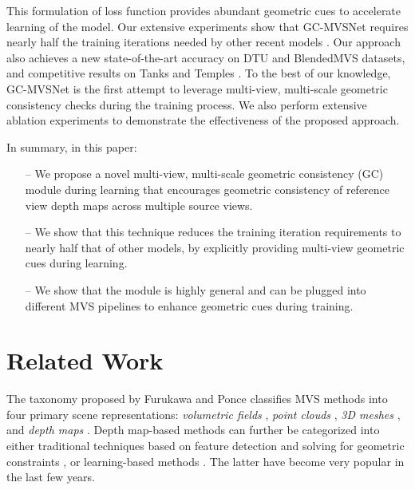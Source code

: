 \documentclass[10pt,twocolumn,letterpaper]{article}
\begin{document}
This formulation of loss function provides abundant geometric cues to
accelerate learning of the model. Our extensive experiments show that
GC-MVSNet requires nearly
half the training iterations needed by other recent models \cite{yao2018mvsnet,
  gu2019casmvsnet, peng2022rethinkingMVS, wei2021aa,
  ding2022transmvsnet}. Our approach also achieves a new state-of-the-art accuracy 
on DTU \cite{jensen2014dtu} and BlendedMVS \cite{yao2019blended}
datasets, and competitive results on
Tanks and Temples
\cite{Knapitsch2017tnt}. To the best
of our knowledge, GC-MVSNet is the first attempt to leverage
multi-view, multi-scale geometric consistency checks during the
training process. We also perform extensive ablation experiments to
demonstrate the effectiveness of the proposed approach.

In summary, in this paper:
\begin{itemize}
\setlength\itemsep{-0.1em}
    \item[--] We propose a novel multi-view, multi-scale geometric consistency (GC) module during learning that encourages geometric consistency of reference view depth maps across multiple source views.
    \item[--] We show that this technique reduces the training iteration requirements to
      nearly half that of other  models,
        by explicitly providing multi-view geometric cues during learning.
    \item[--] We show that the module is highly general and can be plugged into different MVS pipelines to enhance geometric cues during training.
\end{itemize}

\section{Related Work}\label{sec:related works}

The taxonomy proposed by Furukawa and Ponce
\cite{Furukawa2010AccurateDA} classifies MVS methods into four primary
scene representations: \textit{volumetric fields}
\cite{kutulakos1999spacecarving, seitz1997photorealistic,
  faugeras1998, sinha2007graphcut}, \textit{point clouds}
\cite{lhuillier2005quasidense, chen2019pointbased}, \textit{3D meshes}
\cite{fua1995object}, and \textit{depth maps}
\cite{Campbell2008UsingMH, Galliani2015fusibile,
  Johannes2016pixelwise, xu2019multiscale, gu2019casmvsnet,
  yao2018mvsnet, YU2021AAcostvolume, ding2022transmvsnet,
  peng2022rethinkingMVS, Cheng2019USCNet}. Depth map-based methods can
 further be categorized into either traditional techniques based on
feature detection and solving for geometric constraints
\cite{Campbell2008UsingMH, Galliani2015fusibile,
  Furukawa2010AccurateDA, Johannes2016pixelwise}, or learning-based
methods \cite{xu2019multiscale, gu2019casmvsnet, yao2018mvsnet,
  YU2021AAcostvolume, ding2022transmvsnet, peng2022rethinkingMVS,
  Cheng2019USCNet}. The latter have become very popular in
the last few years.
\end{document}
